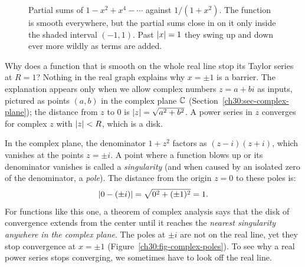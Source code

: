 \begin{figure}[htbp]
\centering
{}
\caption{Partial sums of $1 - x^2 + x^4 - \cdots$ against $1/(1+x^2)$. The function is smooth everywhere, but the partial sums close in on it only inside the shaded interval $(-1,1)$. Past $\lvert x\rvert=1$ they swing up and down ever more wildly as terms are added.}
\label{ch30:fig-bell-partial}
\end{figure}

Why does a function that is smooth on the whole real line stop its Taylor series at $R = 1$?
Nothing in the real graph explains why $x = \pm 1$ is a barrier. The explanation appears only when we allow complex numbers $z = a + bi$ as inputs, pictured as points $(a, b)$ in the complex plane $\mathbb{C}$ (Section~\ref{ch30:sec-complex-plane}); the distance from $z$ to $0$ is $\lvert z\rvert = \sqrt{a^2+b^2}$. A power series in $z$ converges for complex $z$ with $\lvert z\rvert < R$, which is a disk.

In the complex plane, the denominator $1 + z^2$ factors as $(z - i)(z + i)$, which vanishes at the points $z = \pm i$. A point where a function blows up or its denominator vanishes is called a \emph{singularity} (and when caused by an isolated zero of the denominator, a \emph{pole}). The distance from the origin $z = 0$ to these poles is:
\[
  \lvert0 - (\pm i)\rvert = \sqrt{0^2 + (\pm 1)^2} = 1.
\]
For functions like this one, a theorem of complex analysis says that the disk of convergence extends from the center until it reaches the \emph{nearest singularity anywhere in the complex plane}. The poles at $\pm i$ are not on the real line, yet they stop convergence at $x = \pm 1$ (Figure~\ref{ch30:fig-complex-poles}). To see why a real power series stops converging, we sometimes have to look off the real line.

